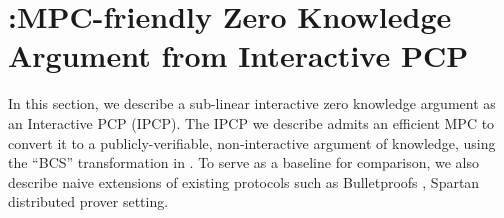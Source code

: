 \section{\name:MPC-friendly Zero Knowledge Argument from Interactive
PCP}\label{sec:graphene}
In this section, we describe a sub-linear interactive zero knowledge argument as
an Interactive PCP (IPCP). The IPCP we describe admits an efficient MPC to
convert it to a publicly-verifiable, non-interactive argument of knowledge,
using the ``BCS'' transformation in \cite{BCS16} .  To serve as a
baseline for comparison, we also describe naive extensions of existing protocols
such as Bulletproofs \cite{bulletproofs}, Spartan \cite{spartan}
distributed prover setting. 

